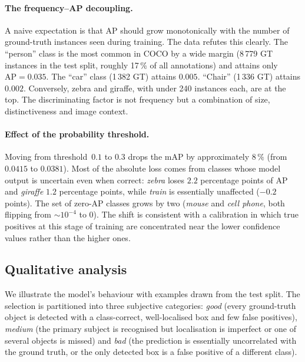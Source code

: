 \paragraph{The frequency--AP decoupling.} A naive expectation is that AP
should grow monotonically with the number of ground-truth instances seen
during training. The data refutes this clearly. The ``person'' class is the
most common in COCO by a wide margin (8\,779 GT instances in the test split,
roughly 17\,\% of all annotations) and attains only $\mathrm{AP}=0.035$. The
``car'' class (1\,382 GT) attains $0.005$. ``Chair'' (1\,336 GT) attains
$0.002$. Conversely, zebra and giraffe, with under 240 instances each, are at
the top. The discriminating factor is not frequency but a combination of size,
distinctiveness and image context.

\paragraph{Effect of the probability threshold.} Moving from threshold~$0.1$
to $0.3$ drops the mAP by approximately $8\,\%$ (from $0.0415$ to $0.0381$).
Most of the absolute loss comes from classes whose model output is uncertain
even when correct: \emph{zebra} loses $2.2$ percentage points of AP and
\emph{giraffe} $1.2$ percentage points, while \emph{train} is essentially
unaffected ($-0.2$ points). The set of zero-AP classes grows by two
(\emph{mouse} and \emph{cell phone}, both flipping from $\sim\!10^{-4}$ to
$0$). The shift is consistent with a calibration in which true positives
at this stage of training are concentrated near the lower confidence values
rather than the higher ones.

\subsection{Qualitative analysis}
\label{sec:results:qualitative}

We illustrate the model's behaviour with examples drawn from the test split.
The selection is partitioned into three subjective categories: \emph{good}
(every ground-truth object is detected with a class-correct, well-localised
box and few false positives), \emph{medium} (the primary subject is
recognised but localisation is imperfect or one of several objects is missed)
and \emph{bad} (the prediction is essentially uncorrelated with the
ground truth, or the only detected box is a false positive of a different
class).


